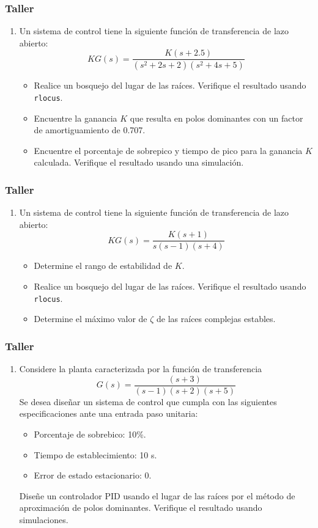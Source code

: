 \documentclass[aspectratio=169,handout]{beamer}
\theoremstyle{definition}
\theoremstyle{plain}
\theoremstyle{remark}
\newcounter{saveenumi}
\newcommand{\seti}{\setcounter{saveenumi}{\value{enumi}}}
\newcommand{\conti}{\setcounter{enumi}{\value{saveenumi}}}
\begin{document}
\begin{frame}[c]\frametitle{Taller}
	\begin{enumerate}
		\conti
		\item Un sistema de control tiene la siguiente función de transferencia de lazo abierto:
		\begin{equation*}
			KG(s) = \frac{K(s+2.5)}{(s^2+2s+2)(s^2+4s+5)}
		\end{equation*}
		\begin{itemize}
			\item Realice un bosquejo del lugar de las raíces. Verifique el resultado usando \texttt{rlocus}.
			\item Encuentre la ganancia $K$ que resulta en polos dominantes con un factor de amortiguamiento de 0.707.
			\item Encuentre el porcentaje de sobrepico y tiempo de pico para la ganancia $K$ calculada. Verifique el resultado usando una simulación.
		\end{itemize}
		\seti
	\end{enumerate}
\end{frame}

\begin{frame}[c]\frametitle{Taller}
	\begin{enumerate}
		\conti
		\item Un sistema de control tiene la siguiente función de transferencia de lazo abierto:
		\begin{equation*}
			KG(s) = \frac{K(s+1)}{s(s-1)(s+4)}
		\end{equation*}
		\begin{itemize}
			\item Determine el rango de estabilidad de $K$.
			\item Realice un bosquejo del lugar de las raíces. Verifique el resultado usando \texttt{rlocus}.
			\item Determine el máximo valor de $\zeta$ de las raíces complejas estables.
		\end{itemize}
		\seti
	\end{enumerate}
\end{frame}

\begin{frame}[c]\frametitle{Taller}
	\begin{enumerate}
		\conti
		\item Considere la planta caracterizada por la función de transferencia
		\begin{equation*}
			G(s) = \frac{(s+3)}{(s-1)(s+2)(s+5)}
		\end{equation*}
		Se desea diseñar un sistema de control que cumpla con las siguientes especificaciones ante una entrada paso unitaria:
		\begin{itemize}
			\item Porcentaje de sobrebico: 10\%.
			\item Tiempo de establecimiento: 10 s.
			\item Error de estado estacionario: 0.
		\end{itemize}
		Diseñe un controlador PID usando el lugar de las raíces por el método de aproximación de polos dominantes. Verifique el resultado usando simulaciones.
	\end{enumerate}
\end{frame}
\end{document}
